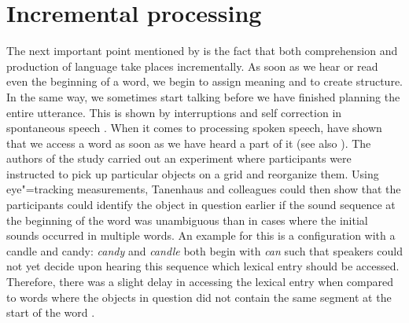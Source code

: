 \section{Incremental processing}
\label{Abschnitt-Inkrementelle-Verarbeitung}

The next important point mentioned by \citet{SW2011a} is the fact that both comprehension and production of language take places incrementally.
As soon as we hear or read even the beginning of a word, we begin to assign meaning and to create structure.
In the same way, we sometimes start talking before we have finished planning the entire utterance.
This is shown by interruptions and self correction in spontaneous speech \citep{CW98a,CFT2002a}.
When it comes to processing spoken speech, \citet{TSKES96a} have shown that we access a word as soon
as we have heard a part of it (see also \citealp{Marslen-Wilson75a}).  The authors of the study carried out an experiment where participants were instructed
to pick up particular objects on a grid and reorganize them. Using eye"=tracking measurements,
Tanenhaus and colleagues could then show that the participants could identify the object in question
earlier if the sound sequence at the beginning of the word was unambiguous than in cases 
where the initial sounds occurred in multiple words. An example for this is a configuration with a candle and candy: \emph{candy} and \emph{candle}
both begin with \emph{can} such that speakers could not yet decide upon hearing this sequence which lexical entry should be accessed. Therefore, there
was a slight delay in accessing the lexical entry when compared to words where the objects in question did not contain the same segment at the
start of the word \citep[]{TSKES95a}.


